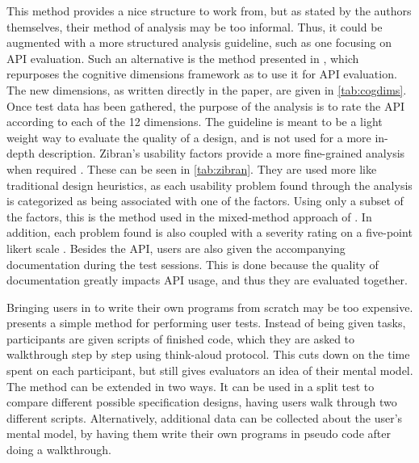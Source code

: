 This method provides a nice structure to work from, but as stated by the authors themselves, their method of analysis may be too informal.
Thus, it could be augmented with a more structured analysis guideline, such as one focusing on \gls{API} evaluation.
Such an alternative is the method presented in \citet{clarke2003using}, which repurposes the cognitive dimensions framework \cite{wikiCognitiveDimensions} as to use it for \gls{API} evaluation.
The new dimensions, as written directly in the paper, are given in \cref{tab:cogdims}.
Once test data has been gathered, the purpose of the analysis is to rate the \gls{API} according to each of the 12 dimensions.
The guideline is meant to be a light weight way to evaluate the quality of a design, and is not used for a more in-depth description.
Zibran’s usability factors provide a more fine-grained analysis when required \cite{zibran2011useful}.
These can be seen in \cref{tab:zibran}.
They are used more like traditional design heuristics, as each usability problem found through the analysis is categorized as being associated with one of the factors.
Using only a subset of the factors, this is the method used in the mixed-method approach of \citet{grill2012methods}.
In addition, each problem found is also coupled with a severity rating on a five-point likert scale \cite{wikiLikert}. 
Besides the \gls{API}, users are also given the accompanying documentation during the test sessions. 
This is done because the quality of documentation greatly impacts \gls{API} usage, and thus they are evaluated together. 

Bringing users in to write their own programs from scratch may be too expensive.
\cite{o2010api} presents a simple method for performing user tests.
Instead of being given tasks, participants are given scripts of finished code, which they are asked to walkthrough step by step using think-aloud protocol.
This cuts down on the time spent on each participant, but still gives evaluators an idea of their mental model.
The method can be extended in two ways. 
It can be used in a split test to compare different possible specification designs, having users walk through two different scripts.
Alternatively, additional data can be collected about the user’s mental model, by having them write their own programs in pseudo code after doing a walkthrough.

